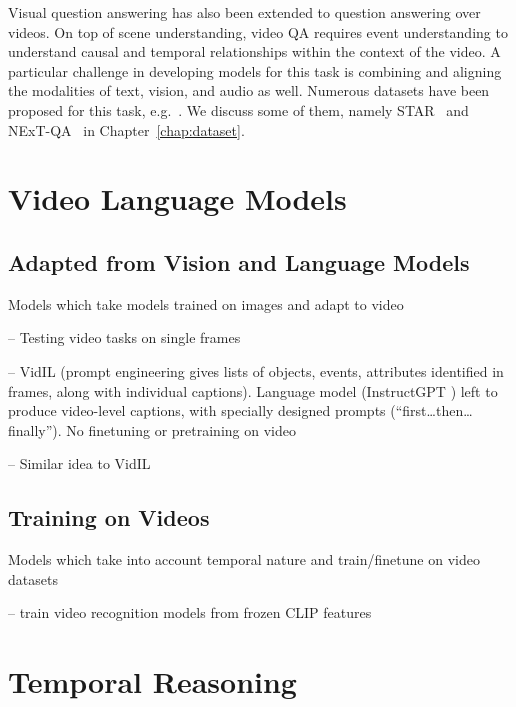 Visual question answering has also been extended to question answering over
videos. On top of scene understanding, video QA requires event understanding to
understand causal and temporal relationships within the context of the video. A
particular challenge in developing models for this task is combining and
aligning the modalities of text, vision, and audio as well.  Numerous datasets
have been proposed for this task,
e.g.~\cite{xu2016msr-vtt,wu2021star,xiao2021nextqa,lei2020tvqaplus}. We discuss
some of them, namely STAR~\cite{wu2021star} and NExT-QA~\cite{xiao2021nextqa}
in Chapter~\ref{chap:dataset}.


\section{Video Language Models}
\label{sec:vidlm}




\subsection{Adapted from Vision and Language Models}
\label{sec:adaptvlm}

Models which take models trained on images and adapt to video

\cite{buch2022revisiting} -- Testing video tasks on single frames

\cite{wang2022vidil} -- VidIL (prompt engineering gives lists of objects,
events, attributes identified in frames, along with individual captions).
Language model (InstructGPT \cite{ouyang2022instructgpt}) left to produce
video-level captions, with specially designed prompts (``first\ldots then\ldots
finally''). No finetuning or pretraining on video

\cite{zeng2023socratic} -- Similar idea to VidIL

\subsection{Training on Videos}
\label{sec:vidtrain}

Models which take into account temporal nature and train/finetune on video datasets

\cite{lin2022evl} -- train video recognition models from frozen CLIP features

\section{Temporal Reasoning}
\label{sec:tempreason}


